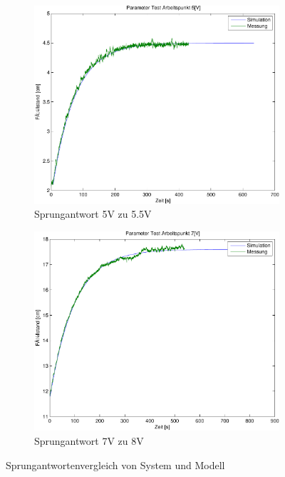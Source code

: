 \begin{figure}[h!]
	\centering
	\begin{subfigure}{0.475\textwidth}
		\includegraphics[width=1\textwidth]{07/parameter_test_5.pdf}
		\caption{Sprungantwort 5V zu 5.5V}
	\end{subfigure}
	\hfill{}
	\begin{subfigure}{0.475\textwidth}
		\includegraphics[width=1\textwidth]{07/parameter_test_7.pdf}
		\caption{Sprungantwort 7V zu 8V}
	\end{subfigure}
	\caption{Sprungantwortenvergleich von System und Modell}
\end{figure}
